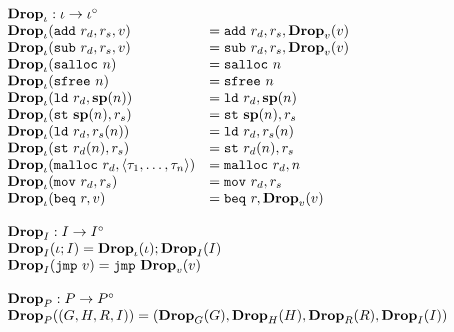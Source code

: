 {\[\begin{array}{l}
\begin{array}{ll}
\rlap{$\mathbf{Drop}_\iota : \iota -> \iota^\circ$} \\
\drop{\iota}{\mathtt{add}\ r_d, r_s, v} &= \mathtt{add}\ r_d, r_s, \drop{v}{v} \\
\drop{\iota}{\mathtt{sub}\ r_d, r_s, v} &= \mathtt{sub}\ r_d, r_s, \drop{v}{v} \\
\drop{\iota}{\mathtt{salloc}\ n} &= \mathtt{salloc}\ n \\
\drop{\iota}{\mathtt{sfree}\ n} &= \mathtt{sfree}\ n \\
\drop{\iota}{\mathtt{ld}\ r_d, \mathbf{sp}(n)} &= \mathtt{ld}\ r_d, \mathbf{sp}(n) \\
\drop{\iota}{\mathtt{st}\ \mathbf{sp}(n), r_s} &= \mathtt{st}\ \mathbf{sp}(n), r_s \\
\drop{\iota}{\mathtt{ld}\ r_d, r_s(n)} &= \mathtt{ld}\ r_d, r_s(n) \\
\drop{\iota}{\mathtt{st}\ r_d(n), r_s} &= \mathtt{st}\ r_d(n), r_s \\
\drop{\iota}{\mathtt{malloc}\ r_d, \langle \tau_1, \dots, \tau_n \rangle} &= \mathtt{malloc}\ r_d, n \\
\drop{\iota}{\mathtt{mov}\ r_d, r_s} &= \mathtt{mov}\ r_d, r_s \\
\drop{\iota}{\mathtt{beq}\ r, v} &= \mathtt{beq}\ r, \drop{v}{v} \\
\end{array} \\\\

\begin{array}{l}
\mathbf{Drop}_I : I -> I^\circ \\
\drop{I}{\iota ; I} = \drop{\iota}{\iota} ; \drop{I}{I} \\
\drop{I}{\mathtt{jmp}\ v} = \mathtt{jmp}\ \drop{v}{v} \\\\

\mathbf{Drop}_P : P -> P^\circ \\
\drop{P}{(G, H, R, I)} = (\drop{G}{G}, \drop{H}{H}, \drop{R}{R}, \drop{I}{I})
\end{array} \\\\

\end{array}\]
}
